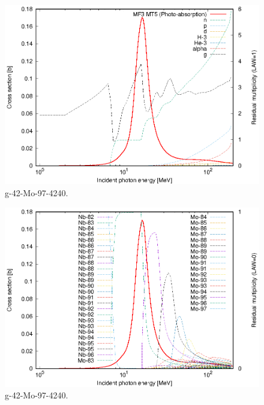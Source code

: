 \begin{figure}
 \includegraphics[width=\linewidth]{eps/g_42-Mo-97_4240.eps}
  \caption{g-42-Mo-97-4240.}
\end{figure}
\begin{figure}
 \includegraphics[width=\linewidth]{eps-law0/g_42-Mo-97_4240.eps}
 \caption{g-42-Mo-97-4240.}
\end{figure}
\newpage \clearpage

